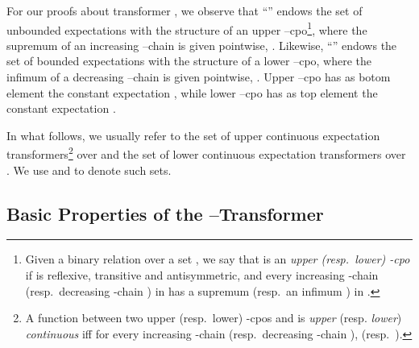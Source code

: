 For our proofs about transformer \wpsymbol, we observe that ``''
endows the set of unbounded expectations \UEX with the structure of an upper
--cpo\footnote{Given a binary relation  over a set , we say
  that  is an \emph{upper (resp.\ lower) -cpo} if  is
  reflexive, transitive and antisymmetric, and every increasing -chain
   (resp.\ decreasing -chain ) in  has
  a supremum  (resp.\ an infimum ) in .}, where the
supremum of an increasing --chain  is given
pointwise, \ie . Likewise,
``'' endows the set of bounded expectations \BEX with the structure of
a lower --cpo, where the infimum of a decreasing --chain
 is given pointwise, \ie
. Upper --cpo 
has as botom element the constant expectation , while lower
--cpo  has as top element the constant expectation
. 

In what follows, we usually refer to the set of upper continuous expectation
transformers\footnote{A function  between two upper (resp.\
  lower) -cpos  and  is \emph{upper}
  (resp. \emph{lower}) \emph{continuous} iff for every increasing -chain
   (resp.\ decreasing -chain ),
   (resp.\ ).}
over  and the set of lower continuous expectation transformers
over . We use  and  to
denote such sets.





\subsection{Basic Properties of the --Transformer}
\label{app:basicproperties}



